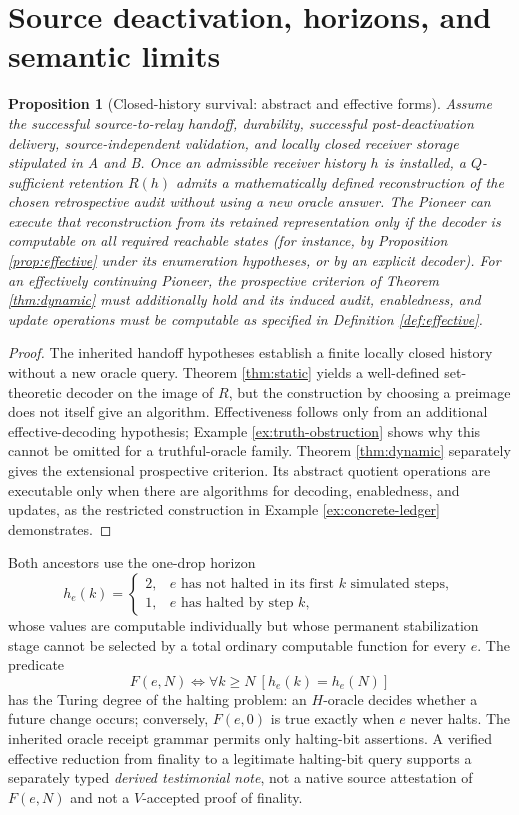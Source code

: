 \documentclass[11pt,letterpaper]{article}
\newtheorem{proposition}[theorem]{Proposition}
\theoremstyle{definition}
\begin{document}
\section{Source deactivation, horizons, and semantic limits}
\begin{proposition}[Closed-history survival: abstract and effective forms]\label{prop:oracle}
Assume the successful source-to-relay handoff, durability, successful post-deactivation delivery, source-independent validation, and locally closed receiver storage stipulated in A and B. Once an admissible receiver history $h$ is installed, a $Q$-sufficient retention $R(h)$ admits a \emph{mathematically defined} reconstruction of the chosen retrospective audit without using a new oracle answer. The Pioneer can \emph{execute} that reconstruction from its retained representation only if the decoder is computable on all required reachable states (for instance, by Proposition \ref{prop:effective} under its enumeration hypotheses, or by an explicit decoder). For an effectively continuing Pioneer, the prospective criterion of Theorem \ref{thm:dynamic} must additionally hold and its induced audit, enabledness, and update operations must be computable as specified in Definition \ref{def:effective}.
\end{proposition}
\begin{proof}
The inherited handoff hypotheses establish a finite locally closed history without a new oracle query. Theorem \ref{thm:static} yields a well-defined set-theoretic decoder on the image of $R$, but the construction by choosing a preimage does not itself give an algorithm. Effectiveness follows only from an additional effective-decoding hypothesis; Example \ref{ex:truth-obstruction} shows why this cannot be omitted for a truthful-oracle family. Theorem \ref{thm:dynamic} separately gives the extensional prospective criterion. Its abstract quotient operations are executable only when there are algorithms for decoding, enabledness, and updates, as the restricted construction in Example \ref{ex:concrete-ledger} demonstrates.
\end{proof}

Both ancestors use the one-drop horizon
\[
h_e(k)=\begin{cases}2,&e\text{ has not halted in its first $k$ simulated steps},\\1,&e\text{ has halted by step $k$},\end{cases}
\]
whose values are computable individually but whose permanent stabilization stage cannot be selected by a total ordinary computable function for every $e$. The predicate
\[
F(e,N)\iff \forall k\ge N\ [h_e(k)=h_e(N)]
\]
has the Turing degree of the halting problem: an $H$-oracle decides whether a future change occurs; conversely, $F(e,0)$ is true exactly when $e$ never halts. The inherited oracle receipt grammar permits only halting-bit assertions. A verified effective reduction from finality to a legitimate halting-bit query supports a separately typed \emph{derived testimonial note}, not a native source attestation of $F(e,N)$ and not a $V$-accepted proof of finality.
\end{document}
